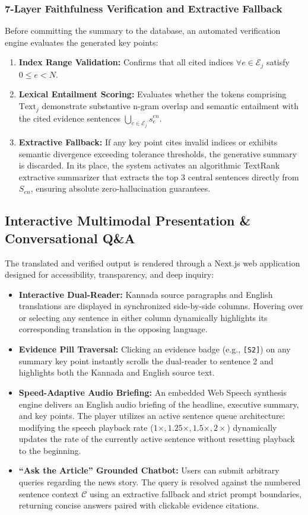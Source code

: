 \documentclass[conference]{IEEEtran}
\begin{document}
\subsubsection{7-Layer Faithfulness Verification and Extractive Fallback}
Before committing the summary to the database, an automated verification engine evaluates the generated key points:
\begin{enumerate}
    \item \textbf{Index Range Validation:} Confirms that all cited indices $\forall e \in \mathcal{E}_j$ satisfy $0 \le e < N$.
    \item \textbf{Lexical Entailment Scoring:} Evaluates whether the tokens comprising $\text{Text}_j$ demonstrate substantive n-gram overlap and semantic entailment with the cited evidence sentences $\bigcup_{e \in \mathcal{E}_j} s_e^{en}$.
    \item \textbf{Extractive Fallback:} If any key point cites invalid indices or exhibits semantic divergence exceeding tolerance thresholds, the generative summary is discarded. In its place, the system activates an algorithmic TextRank extractive summarizer that extracts the top 3 central sentences directly from $S_{en}$, ensuring absolute zero-hallucination guarantees.
\end{enumerate}

\subsection{Interactive Multimodal Presentation \& Conversational Q\&A}
The translated and verified output is rendered through a Next.js web application designed for accessibility, transparency, and deep inquiry:
\begin{itemize}
    \item \textbf{Interactive Dual-Reader:} Kannada source paragraphs and English translations are displayed in synchronized side-by-side columns. Hovering over or selecting any sentence in either column dynamically highlights its corresponding translation in the opposing language.
    \item \textbf{Evidence Pill Traversal:} Clicking an evidence badge (e.g., \texttt{[S2]}) on any summary key point instantly scrolls the dual-reader to sentence 2 and highlights both the Kannada and English source text.
    \item \textbf{Speed-Adaptive Audio Briefing:} An embedded Web Speech synthesis engine delivers an English audio briefing of the headline, executive summary, and key points. The player utilizes an active sentence queue architecture: modifying the speech playback rate ($1\times, 1.25\times, 1.5\times, 2\times$) dynamically updates the rate of the currently active sentence without resetting playback to the beginning.
    \item \textbf{``Ask the Article'' Grounded Chatbot:} Users can submit arbitrary queries regarding the news story. The query is resolved against the numbered sentence context $\mathcal{C}$ using an extractive fallback and strict prompt boundaries, returning concise answers paired with clickable evidence citations.
\end{itemize}
\end{document}
